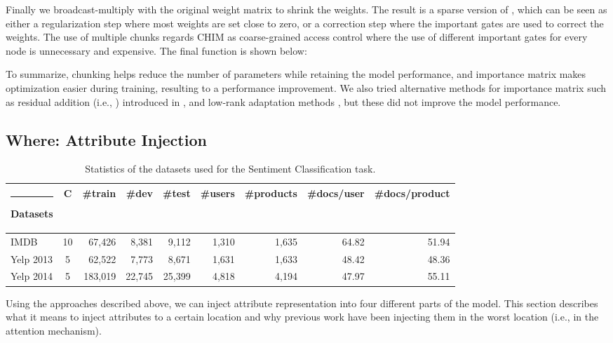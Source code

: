 \documentclass[11pt,a4paper]{article}
\makeatletter
\newcommand{\thickhline}{\noalign {\ifnum 0=`}\fi \hrule height 1pt
    \futurelet \reserved@a \@xhline
}
\makeatother
\begin{document}
Finally we broadcast-multiply  with the original weight matrix  to shrink the weights. The result is a sparse version of , which can be seen as either a regularization step \cite{ng2004feature} where most weights are set close to zero, or a correction step \cite{amplayo2018translations} where the important gates are used to correct the weights. 
The use of multiple chunks regards CHIM as coarse-grained access control \cite{shen2019ordered} where the use of different important gates for every node is unnecessary and expensive.
The final function is shown below:


To summarize, chunking helps reduce the number of parameters while retaining the model performance, and importance matrix makes optimization easier during training, resulting to a performance improvement.
We also tried alternative methods for importance matrix such as residual addition
(i.e., ) introduced in \citet{he2016deep}, and low-rank adaptation methods \cite{jaech2018low,kim2019categorical}, but these did not improve the model performance.

\subsection{Where: Attribute Injection}

\begin{table*}[t]
  \centering
    \begin{tabular}{@{~}lcrrrrrrr@{~}}
    \thickhline
    Datasets & C     & \#train & \#dev & \#test & \#users & \#products & \#docs/user & \#docs/product \\
    \hline
    IMDB  & 10    &     67,426  &     8,381  &     9,112  &   1,310  &   1,635  &          64.82  &          51.94  \\
    Yelp 2013 & 5     &     62,522  &     7,773  &     8,671  &   1,631  &   1,633  &          48.42  &          48.36  \\
    Yelp 2014 & 5     &   183,019  &   22,745  &   25,399  &   4,818  &   4,194  &          47.97  &          55.11  \\
    \hline
    \end{tabular}\caption{Statistics of the datasets used for the Sentiment Classification task.}
  \label{tab:datasets}\end{table*}

Using the approaches described above, we can inject attribute representation into four different parts of the model. This section describes what it means to inject attributes to a certain location and why previous work have been injecting them in the worst location (i.e., in the attention mechanism).
\end{document}
